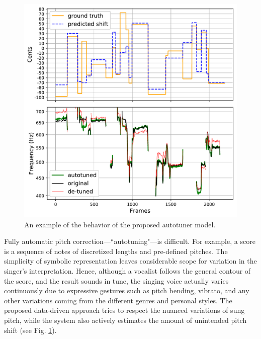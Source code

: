 \begin{figure}[t]
    \centering
    \includegraphics[width=\columnwidth]{figures/results.pdf}
    \caption{An example of the behavior of the proposed autotuner model.}
    \label{fig:results}
\end{figure}

Fully automatic pitch correction---``autotuning"---is difficult. For example, a score is a sequence of notes of discretized lengths and pre-defined pitches. The simplicity of symbolic representation leaves considerable scope for variation in the singer's interpretation. Hence, although a vocalist follows the general contour of the score, and the result sounds in tune, the singing voice actually varies continuously due to expressive gestures such as pitch bending, vibrato, and any other variations coming from the different genres and personal styles. The proposed data-driven approach tries to respect the nuanced variations of sung pitch, while the system also actively estimates the amount of unintended pitch shift (see Fig. \ref{fig:results}).

